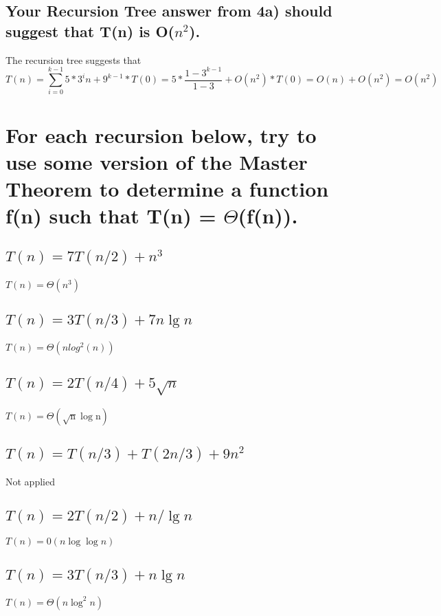 \documentclass[a4paper]{article}
\begin{document}
\subsection{Your Recursion Tree answer from 4a) should suggest that T(n) is O($n^2$).}
The recursion tree suggests that 
$$T(n)=\sum^{k-1}_{i=0} 5*3^i n + 9^{k-1}*T(0)=5*\frac{1-3^{k-1}}{1-3} +O(n^2)*T(0)=O(n)+O(n^2)=O(n^2)$$ 
\section{For each recursion below, try to use some version of the Master Theorem to determine a function f(n) such that T(n) = $\Theta$(f(n)).}

\subsection{$T(n)=7 T(n / 2)+n^3$}
$T(n)=\Theta(n^3)$
\subsection{$T(n)=3 T(n / 3)+7 n \lg n$}
$T(n)=\Theta(nlog^2(n))$
\subsection{$T(n)=2 T(n / 4)+5 \sqrt{n}$}
$T(n)=\Theta(\sqrt{\mathrm{n}} \log \mathrm{n})$
\subsection{$T(n)=T(n / 3)+T(2 n / 3)+9 n^2$}
Not applied
\subsection{$T(n)=2 T(n / 2)+n / \lg n$}
$T(n)=0(n \log \log n)$
\subsection{$T(n)=3 T(n / 3)+n \lg n$}
$T(n)=\Theta(n \log ^2 n)$
\end{document}
